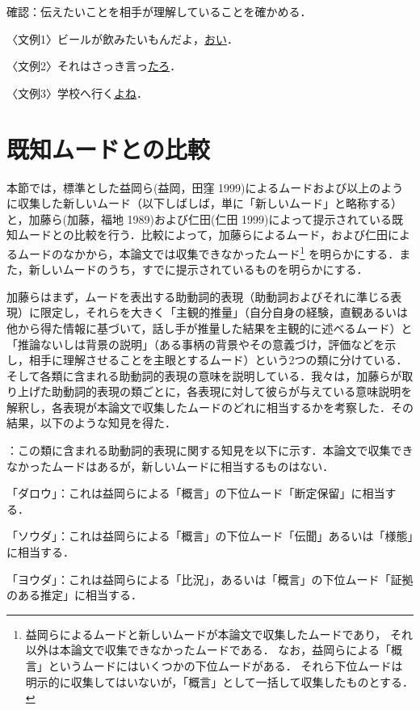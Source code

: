 \documentclass[japanese]{jnlp_1.4}
\newcommand{\InH}[1]{}
\newcommand{\InHone}[1]{}
\begin{document}
\InH{(23)}
確認：伝えたいことを相手が理解していることを確かめる．

〈文例1〉ビールが飲みたいもんだよ，\ul{おい}．

〈文例2〉それはさっき言っ\ul{たろ}．

〈文例3〉学校へ行く\ul{よね}．



\section{既知ムードとの比較}

本節では，標準とした益岡ら(益岡，田窪 1999)によるムードおよび以上のように収集した新しいムード（以下しばしば，単に「新しいムード」と略称する）と，加藤ら(加藤，福地 1989)および仁田(仁田 1999)によって提示されている既知ムードとの比較を行う．比較によって，加藤らによるムード，および仁田によるムードのなかから，本論文では収集できなかったムード\footnote{
	益岡らによるムードと新しいムードが本論文で収集したムードであり，
	それ以外は本論文で収集できなかったムードである．
	なお，益岡らによる「概言」というムードにはいくつかの下位ムードがある．
	それら下位ムードは明示的に収集してはいないが，「概言」として一括して収集したものとする．}
を明らかにする．また，新しいムードのうち，すでに提示されているものを明らかにする．

加藤らはまず，ムードを表出する助動詞的表現（助動詞およびそれに準じる表現）に限定し，それらを大きく「主観的推量」（自分自身の経験，直観あるいは他から得た情報に基づいて，話し手が推量した結果を主観的に述べるムード）と「推論ないしは背景の説明」（ある事柄の背景やその意義づけ，評価などを示し，相手に理解させることを主眼とするムード）という2つの類に分けている．そして各類に含まれる助動詞的表現の意味を説明している．我々は，加藤らが取り上げた助動詞的表現の類ごとに，各表現に対して彼らが与えている意味説明を解釈し，各表現が本論文で収集したムードのどれに相当するかを考察した．その結果，以下のような知見を得た．

\InHone{(1)}
：この類に含まれる助動詞的表現に関する知見を以下に示す．本論文で収集できなかったムードはあるが，新しいムードに相当するものはない．

\InH{(1-1)}「ダロウ」：これは益岡らによる「概言」の下位ムード「断定保留」に相当する．

\InH{(1-2)}「ソウダ」：これは益岡らによる「概言」の下位ムード「伝聞」あるいは「様態」に相当する．

\InH{(1-3)}「ヨウダ」：これは益岡らによる「比況」，あるいは「概言」の下位ムード「証拠のある推定」に相当する．
\end{document}
